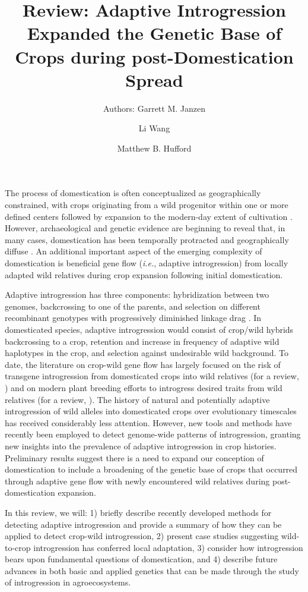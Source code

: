 \documentclass[11pt]{article}
\title{Review: Adaptive Introgression Expanded the Genetic Base of Crops during post-Domestication Spread}
\author[1]{Authors: Garrett M. Janzen}%
\author[1]{Li Wang}
\author[1,*]{Matthew B. Hufford}
\affil[1]{Department of Ecology, Evolution, and Organismal Biology, Iowa State University, Ames, Iowa, USA}
\affil[*]{Correspondence: mhufford@iastate.edu (M.B. Hufford)}
\date{}
\begin{document}
\maketitle


The process of domestication is often conceptualized as geographically constrained, with crops originating from a wild progenitor within one or more defined centers followed by expansion to the modern-day extent of cultivation \cite{Harlan1992}.
However, archaeological and genetic evidence are beginning to reveal that, in many cases, domestication has been temporally protracted and geographically diffuse \cite{brown2009complex, Meyer2016, wang2017, zhou2017, Fuller2014}.
An additional important aspect of the emerging complexity of domestication is beneficial gene flow (\emph{i.e.}, adaptive introgression) from locally adapted wild relatives during crop expansion following initial domestication.


Adaptive introgression has three components: hybridization between two genomes, backcrossing to one of the parents, and selection on different recombinant genotypes with progressively diminished linkage drag \cite{barton2001role, Feuillet200824}.
In domesticated species, adaptive introgression would consist of crop/wild hybrids backcrossing to a crop, retention and increase in frequency of adaptive wild haplotypes in the crop, and selection against undesirable wild background.
To date, the literature on crop-wild gene flow has largely focused on the risk of transgene introgression from domesticated crops into wild relatives (for a review, \cite{stewart2003transgene}) and on modern plant breeding efforts to introgress desired traits from wild relatives (for a review, \cite{Dempewolf2017}).
The history of natural and potentially adaptive introgression of wild alleles into domesticated crops over evolutionary timescales has received considerably less attention.
However, new tools and methods have recently been employed to detect genome-wide patterns of introgression, granting new insights into the prevalence of adaptive introgression in crop histories.
Preliminary results suggest there is a need to expand our conception of domestication to include a broadening of the genetic base of crops that occurred through adaptive gene flow with newly encountered wild relatives during post-domestication expansion.

In this review, we will: 1) briefly describe recently developed methods for detecting adaptive introgression and provide a summary of how they can be applied to detect crop-wild introgression, 2) present case studies suggesting wild-to-crop introgression has conferred local adaptation, 3) consider how introgression bears upon fundamental questions of domestication, and 4) describe future advances in both basic and applied genetics that can be made through the study of introgression in agroecosystems.
\end{document}
